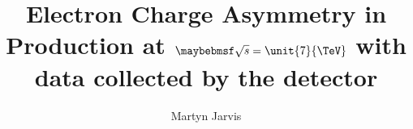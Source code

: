 \documentclass[hyper,draft,nobind,oneside,noroman]{mythesis}
\title{Electron Charge Asymmetry in \inclusiveWe Production at $\sqrtS=\unit{7}{\TeV}$ with data collected by the \CMS detector}
\author{Martyn Jarvis}
\begin{document}
\begin{frontmatter}
  
\end{frontmatter}

\begin{mainmatter}
  
  
  
  
  
  
  
\end{mainmatter}

\begin{appendices}
\end{appendices}

% 
% 
% 
\end{document}

